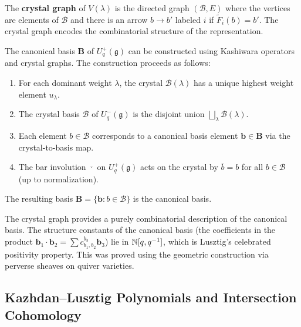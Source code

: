 \begin{definition}
The \textbf{crystal graph} of $V(\lambda)$ is the directed graph $(\mathcal{B}, E)$ where the vertices are elements of $\mathcal{B}$ and there is an arrow $b \to b'$ labeled $i$ if $\tilde{F}_i(b) = b'$. The crystal graph encodes the combinatorial structure of the representation.
\end{definition}

\begin{theorem}
The canonical basis $\mathbf{B}$ of $U_q^+(\mathfrak{g})$ can be constructed using Kashiwara operators and crystal graphs. The construction proceeds as follows:
\begin{enumerate}
    \item For each dominant weight $\lambda$, the crystal $\mathcal{B}(\lambda)$ has a unique highest weight element $u_\lambda$.
    \item The crystal basis $\mathcal{B}$ of $U_q^-(\mathfrak{g})$ is the disjoint union $\bigsqcup_\lambda \mathcal{B}(\lambda)$.
    \item Each element $b \in \mathcal{B}$ corresponds to a canonical basis element $\mathbf{b} \in \mathbf{B}$ via the crystal-to-basis map.
    \item The bar involution $\overline{\cdot}$ on $U_q^+(\mathfrak{g})$ acts on the crystal by $\overline{b} = b$ for all $b \in \mathcal{B}$ (up to normalization).
\end{enumerate}
The resulting basis $\mathbf{B} = \{\mathbf{b}: b \in \mathcal{B}\}$ is the canonical basis.
\end{theorem}

\begin{remark}
The crystal graph provides a purely combinatorial description of the canonical basis. The structure constants of the canonical basis (the coefficients in the product $\mathbf{b}_1 \cdot \mathbf{b}_2 = \sum c_{b_1, b_2}^{b_3} \mathbf{b}_3$) lie in $\mathbb{N}[q, q^{-1}]$, which is Lusztig's celebrated positivity property. This was proved using the geometric construction via perverse sheaves on quiver varieties.
\end{remark}

\subsection{Kazhdan--Lusztig Polynomials and Intersection Cohomology}

